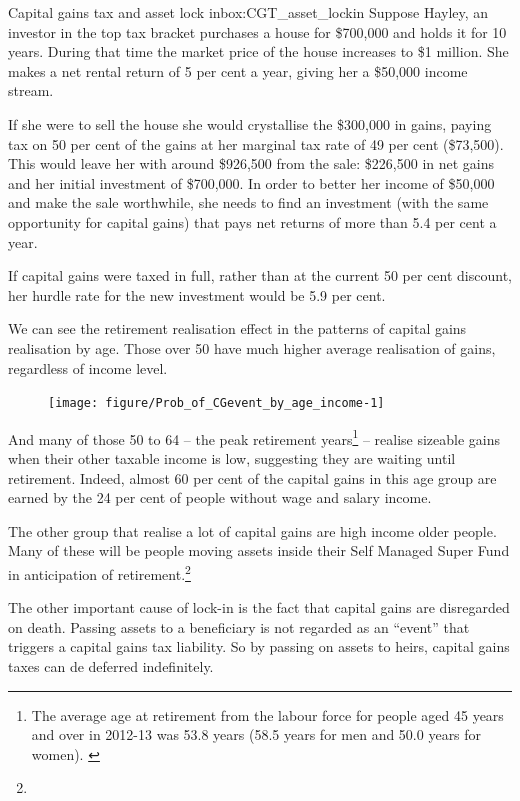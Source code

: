 \documentclass{grattan}\usepackage[]{graphicx}\usepackage[]{color}
\newcommand\gao{Grattan analysis of}
\begin{document}
\begin{smallbox}{Capital gains tax and asset lock in}{box:CGT_asset_lockin}
Suppose Hayley, an investor in the top tax bracket purchases a house for \$700,000 and holds it for 10 years. During that time the market price of the house increases to \$1 million. She makes a net rental return of 5 per cent a year, giving her a \$50,000 income stream. 

If she were to sell the house she would crystallise the \$300,000 in gains, paying tax on 50 per cent of the gains at her marginal tax rate of 49 per cent (\$73,500). This would leave her with around \$926,500 from the sale: \$226,500 in net gains and her initial investment of \$700,000. In order to better her income of \$50,000 and make the sale worthwhile, she needs to find an investment (with the same opportunity for capital gains) that pays net returns of more than 5.4 per cent a year.

If capital gains were taxed in full, rather than at the current 50 per cent discount, her hurdle rate for the new investment would be 5.9 per cent. 
\end{smallbox}

We can see the retirement realisation effect in the patterns of capital gains realisation by age. Those over 50 have much higher average realisation of gains, regardless of income level.


\begin{figure}
\texttt{[image: figure/Prob\_of\_CGevent\_by\_age\_income-1]}
\source{\gao\ \textcite{ATO2013i}}
\end{figure}
And many of those 50 to 64 -- the peak retirement years\footnote{The average age at retirement from the labour force for people aged 45 years and over in 2012-13 was 53.8 years (58.5 years for men and 50.0 years for women). \textcite{ABS2013}} -- realise sizeable gains when their other taxable income is low, suggesting they are waiting until retirement. Indeed, almost 60 per cent of the capital gains in this age group are earned by the 24 per cent of people without wage and salary income. 

The other group that realise a lot of capital gains are high income older people. Many of these will be people moving assets inside their Self Managed Super Fund in anticipation of retirement.\footnote{}

The other important cause of lock-in is the fact that capital gains are disregarded on death. Passing assets to a beneficiary is not regarded as an ``event'' that triggers a capital gains tax liability. So by passing on assets to heirs, capital gains taxes can de deferred indefinitely. 
\end{document}
